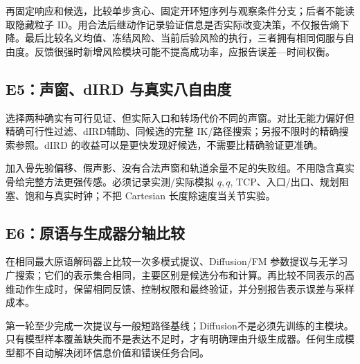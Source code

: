 \documentclass[UTF8,fontset=fandol,11pt,a4paper]{ctexart}
\theoremstyle{plain}
\theoremstyle{definition}
\theoremstyle{remark}
\numberwithin{equation}{section}
\begin{document}
再固定响应和候选，比较单步贪心、固定开环短序列与观察条件分支；后者不能读取隐藏粒子 ID。用合法后继动作记录验证信息是否实际改变决策，不仅报告熵下降。最后比较名义均值、冻结风险、当前后验风险的执行，三者拥有相同伺服与自由度。反馈很强时新增风险模块可能不提高成功率，应报告误差—时间权衡。

\subsection{E5：声窗、dIRD 与真实八自由度}
选择两种确实有可行见证、但实际入口和转场代价不同的声窗。对比无能力偏好但精确可行性过滤、dIRD辅助、同候选的完整 IK/路径搜索；另报不限时的精确搜索参照。dIRD 的收益可以是更快发现好候选，不需要比精确验证更准确。

加入骨先验偏移、假声影、没有合法声窗和轨道余量不足的失败组。不用隐含真实骨给完整方法更强传感。必须记录实测/实际模拟 $q,\dot q$, TCP、入口/出口、规划阻塞、饱和与真实时钟；不把 Cartesian 长度除速度当关节实验。

\subsection{E6：原语与生成器分轴比较}
在相同最大原语解码器上比较一次多模式提议、Diffusion/FM 参数提议与无学习广搜索；它们的表示集合相同，主要区别是候选分布和计算。再比较不同表示的高维动作生成时，保留相同反馈、控制权限和最终验证，并分别报告表示误差与采样成本。

第一轮至少完成一次提议与一般短路径基线；Diffusion不是必须先训练的主模块。只有模型样本覆盖缺失而不是表达不足时，才有明确理由升级生成器。任何生成模型都不自动解决闭环信息价值和错误任务合同。
\end{document}
